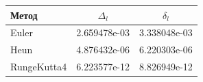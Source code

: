 \begin{tabular}{lcc}
\toprule
Метод & $\Delta_l$ & $\delta_l$ \\
\midrule
Euler & 2.659478e-03 & 3.338048e-03 \\
Heun & 4.876432e-06 & 6.220303e-06 \\
RungeKutta4 & 6.223577e-12 & 8.826949e-12 \\
\bottomrule
\end{tabular}